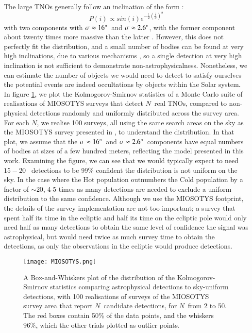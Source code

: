 \documentclass[printer]{aa}
\begin{document}
{The large TNOs generally follow an inclination of the form \citet{2001AJ....121.2804B} :
\begin{equation}
    P\left(i\right) \propto sin\left(i\right) e^{-\frac{1}{2}\left(\frac{i}{\sigma}\right)^2}
\end{equation}
with two components with $\sigma \approx 16\degree$~and $\sigma \approx 2.6\degree$, with the former component about twenty times more massive than the latter \citep{2014ApJ...782..100F}.  However, this does not perfectly fit the distribution, and a small number of bodies can be found at very high inclinations, due to various mechanisms \citep{2011Icar..215..661G,2016ApJ...827L..24C}, so a single detection at very high inclination is not sufficient to demonstrate non-astrophysicalness.  Nonetheless, we can estimate the number of objects we would need to detect to satisfy ourselves the potential events are indeed occultations by objects within the Solar system.  In figure \ref{fig:NeededOccultations}, we plot the Kolmogorov-Smirnov statistics of a Monte Carlo suite of realisations of MIOSOTYS surveys that detect $N$~real TNOs, compared to non-physical detections randomly and uniformly distributed across the survey area.  For each $N$, we realise 100 surveys, all using the same search areas on the sky as the MIOSOTYS survey presented in \citet{2020submitted}, to understand the distribution.  In that plot, we assume that the $\sigma \approx 16\degree$~and $\sigma \approx 2.6\degree$~components have equal numbers of bodies at sizes of a few hundred meters, reflecting the model presented in this work.  Examining the figure, we can see that we would typically expect to need $15-20$~ detections to be 99\% confident the distribution is not uniform on the sky.  In the case where the Hot population outnumbers the Cold population by a factor of $\sim 20$, 4-5 times as many detections are needed to exclude a uniform distribution to the same confidence.  Although we use the MIOSOTYS footprint, the details of the survey implementation are not too important; a survey that spent half its time in the ecliptic and half its time on the ecliptic pole would only need half as many detections to obtain the same level of confidence the signal was astrophysical, but would need twice as much survey time to obtain the detections, as only the observations in the ecliptic would produce detections.

\begin{figure}
  \texttt{[image: MIOSOTYS.png]}
  \caption{A Box-and-Whiskers plot of the distribution of the Kolmogorov-Smirnov statistics comparing astrophysical detections to sky-uniform detections, with 100 realisations of surveys of the MIOSOTYS survey area that report $N$~candidate detections, for $N$~from 2 to 50.  The red boxes contain 50\% of the data points, and the whiskers 96\%, which the other trials plotted as outlier points.}
  \label{fig:NeededOccultations}
\end{figure}

}
\end{document}
